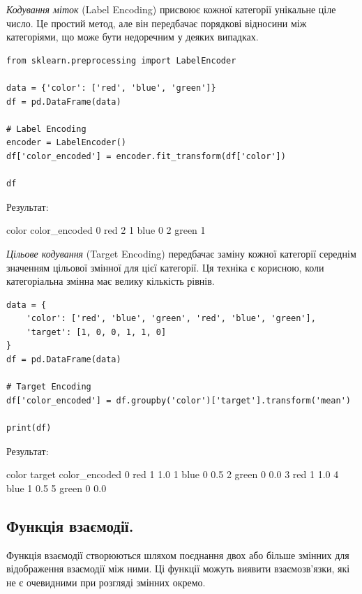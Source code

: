 \textit{Кодування міток} (Label Encoding) присвоює кожної категорії унікальне ціле число. Це простий 
метод, 
але він передбачає порядкові відносини між категоріями, що може бути недоречним у деяких випадках.


\begin{lstlisting}
from sklearn.preprocessing import LabelEncoder

data = {'color': ['red', 'blue', 'green']}
df = pd.DataFrame(data)

# Label Encoding
encoder = LabelEncoder()
df['color_encoded'] = encoder.fit_transform(df['color'])

df
\end{lstlisting}

Результат:

\begin{console}
	color	color_encoded
0	red	2
1	blue	0
2	green	1
\end{console}

\textit{Цільове кодування} (Target Encoding) передбачає заміну кожної категорії середнім значенням 
цільової змінної для цієї категорії. Ця техніка є корисною, коли категоріальна змінна має 
велику кількість рівнів.

\begin{lstlisting}
data = {
    'color': ['red', 'blue', 'green', 'red', 'blue', 'green'],
    'target': [1, 0, 0, 1, 1, 0]
}
df = pd.DataFrame(data)

# Target Encoding
df['color_encoded'] = df.groupby('color')['target'].transform('mean')

print(df)
\end{lstlisting}

Результат:

\begin{console}
   color  target  color_encoded
0    red       1            1.0
1   blue       0            0.5
2  green       0            0.0
3    red       1            1.0
4   blue       1            0.5
5  green       0            0.0
\end{console}

\subsection{Функція взаємодії.}

Функція взаємодії створюються шляхом поєднання двох або більше змінних для відображення 
взаємодії між ними. Ці функції можуть виявити взаємозв'язки, які не є очевидними при 
розгляді змінних окремо.

